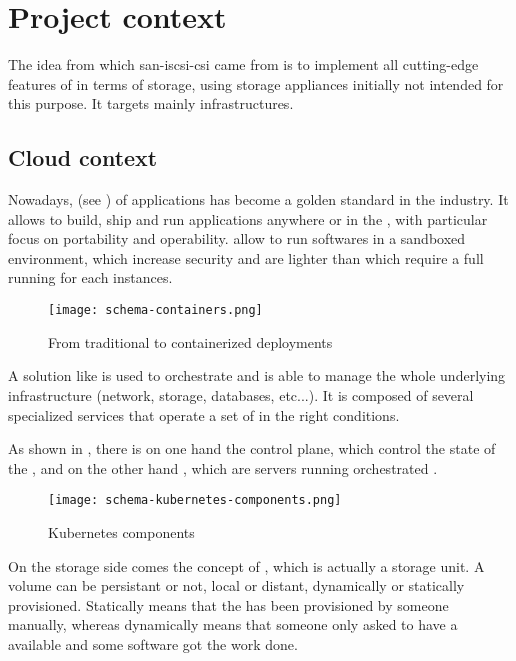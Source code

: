 \section{Project context}

The idea from which \gls{san-iscsi-csi} came from is to implement all cutting-edge features of  in terms of storage, using storage appliances initially not intended for this purpose. It targets mainly   infrastructures.

\subsection{Cloud context}

Nowadays,  (see ) of applications has become a golden standard in the industry. It allows to build, ship and run applications anywhere  or in the , with particular focus on portability and operability.  allow to run softwares in a sandboxed environment, which increase security and are lighter than  which require a full  running for each instances.

\begin{figure}[h]
    \centering
    \texttt{[image: schema-containers.png]}
    \caption{From traditional to containerized deployments}
    \label{fig:containers}
\end{figure}

A solution like  is used to orchestrate  and is able to manage the whole underlying infrastructure (network, storage, databases, etc...). It is composed of several specialized services that operate a set of  in the right conditions.

As shown in , there is on one hand the control plane, which control the state of the , and on the other hand  , which are servers running orchestrated .

\begin{figure}[h]
    \centering
    \texttt{[image: schema-kubernetes-components.png]}
    \caption{Kubernetes components}
    \label{fig:k8s-components}
\end{figure}

On the storage side comes the concept of , which is actually a storage unit. A volume can be persistant or not, local or distant, dynamically or statically provisioned. Statically means that the  has been provisioned by someone manually, whereas dynamically means that someone only asked to have a  available and some software got the work done.

